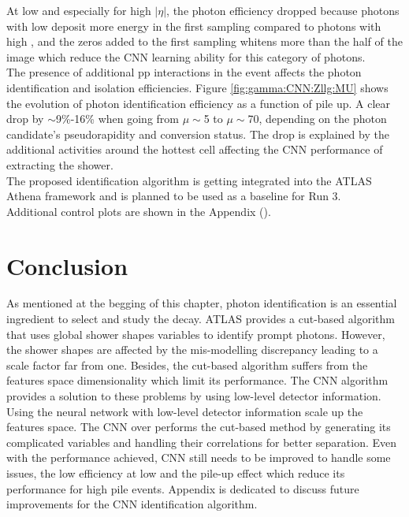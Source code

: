 At low \eT and especially for high $|\eta|$, the photon efficiency dropped because photons with low \eT deposit more energy in the first sampling compared to photons with high \eT, and the zeros added to the first sampling whitens more than the half of the image which reduce the CNN learning ability for this category of photons. \\
The presence of additional pp interactions in the event affects the photon identification and isolation efficiencies. Figure \ref{fig:gamma:CNN:Zllg:MU} shows the evolution of photon identification efficiency as a function of pile up. A clear drop by $\sim$9\%-16\% when going from $\mu\sim$5 to $\mu\sim$70, depending on the photon candidate's pseudorapidity and conversion status. The drop is explained by the additional activities around the hottest cell affecting the CNN performance of extracting the shower. \\
The proposed identification algorithm is getting integrated into the ATLAS Athena framework and is planned to be used as a baseline for Run 3. \\
Additional control plots are shown in the Appendix ().

\section{Conclusion}
\label{gamma:conc}



As mentioned at the begging of this chapter, photon identification is an essential ingredient to select and study the \HHyybb decay. ATLAS provides a cut-based algorithm that uses global shower shapes variables to identify prompt photons. However, the shower shapes are affected by the mis-modelling discrepancy leading to a scale factor far from one. Besides, the cut-based algorithm suffers from the features space dimensionality which limit its performance. The CNN algorithm provides a solution to these problems by using low-level detector information. Using the neural network with low-level detector information scale up the features space. The CNN over performs the cut-based method by generating its complicated variables and handling their correlations for better separation. Even with the performance achieved, CNN still needs to be improved to handle some issues, the low efficiency at low \eT and the pile-up effect which reduce its performance for high pile events. Appendix is dedicated to discuss future improvements for the CNN identification algorithm. 
